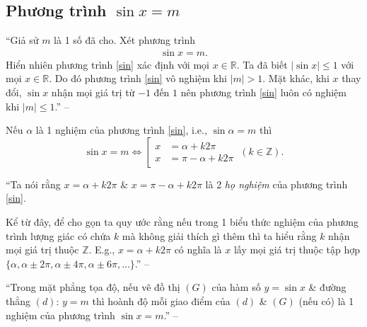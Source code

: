 \documentclass[oneside]{book}
\numberwithin{equation}{section}
\begin{document}
\subsection{Phương trình $\sin x = m$}
``Giả sử $m$ là 1 số đã cho. Xét phương trình
\begin{align}
	\label{sin}
	\tag{sin}
	\sin x = m.
\end{align}
Hiển nhiên phương trình \eqref{sin} xác định với mọi $x\in\mathbb{R}$. Ta đã biết $|\sin x|\le 1$ với mọi $x\in\mathbb{R}$. Do đó phương trình \eqref{sin} vô nghiệm khi $|m| > 1$. Mặt khác, khi $x$ thay đổi, $\sin x$ nhận mọi giá trị từ $-1$ đến $1$ nên phương trình \eqref{sin} luôn có nghiệm khi $|m|\le 1$.'' -- \cite[p. 20]{SGK_Toan_11_dai_so_giai_tich_nang_cao}
\begin{tcolorbox}
	Nếu $\alpha$ là 1 nghiệm của phương trình \eqref{sin}, i.e., $\sin\alpha = m$ thì
	\begin{equation}
		\label{root sin}
		\sin x = m\Leftrightarrow\left[\begin{split}
			x &= \alpha + k2\pi\\
			x &= \pi - \alpha + k2\pi
		\end{split}\right.\ (k\in\mathbb{Z}).
	\end{equation}
\end{tcolorbox}
``Ta nói rằng $x = \alpha + k2\pi$ \& $x = \pi - \alpha + k2\pi$ là 2 \textit{họ nghiệm} của phương trình \eqref{sin}.

Kể từ đây, để cho gọn ta quy ước rằng nếu trong 1 biểu thức nghiệm của phương trình lượng giác có chứa $k$ mà không giải thích gì thêm thì ta hiểu rằng $k$ nhận mọi giá trị thuộc $\mathbb{Z}$. E.g., $x = \alpha + k2\pi$ có nghĩa là $x$ lấy mọi giá trị thuộc tập hợp $\{\alpha,\alpha\pm 2\pi,\alpha\pm 4\pi,\alpha\pm 6\pi,\ldots\}$.'' -- \cite[p. 21]{SGK_Toan_11_dai_so_giai_tich_nang_cao}

``Trong mặt phẳng tọa độ, nếu vẽ đồ thị $(G)$ của hàm số $y = \sin x$ \& đường thẳng $(d)$: $y = m$ thì hoành độ mỗi giao điểm của $(d)$ \& $(G)$ (nếu có) là 1 nghiệm của phương trình $\sin x = m$.'' -- \cite[p. 22]{SGK_Toan_11_dai_so_giai_tich_nang_cao}
\end{document}
